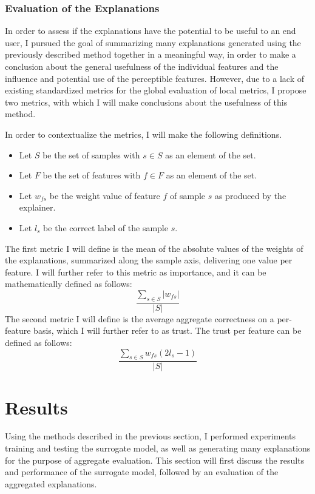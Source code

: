 \documentclass{article}
\begin{document}
			\subsubsection{Evaluation of the Explanations}
			In order to assess if the explanations have the potential to be useful to an end
			user, I pursued the goal of summarizing many explanations generated using the
			previously described method together in a meaningful way, in order to make a
			conclusion about the general usefulness of the individual features and the influence
			and potential use of the perceptible features. However, due to a lack of existing
			standardized metrics for the global evaluation of local metrics, I propose two
			metrics, with which I will make conclusions about the usefulness of this method.
			\par
			In order to contextualize the metrics, I will make the following definitions.
			\begin{itemize}
				\item Let \(S\) be the set of samples with \(s \in S\) as an element of the set.
				\item Let \(F\) be the set of features with \(f \in F\) as an element of the set.
				\item Let \(w_{fs}\) be the weight value of feature \(f\) of sample \(s\) as
					produced by the explainer.
				\item Let \(l_{s}\) be the correct label of the sample \(s\).
			\end{itemize}
			The first metric I will define is the mean of the absolute values of the weights of
			the explanations, summarized along the sample axis, delivering one value per feature.
			I will further refer to this metric as importance, and it can be mathematically
			defined as follows:
			\[\frac{\sum_{s \in S} |w_{fs}|}{|S|}\]
			The second metric I will define is the average aggregate correctness on a per-feature
			basis, which I will further refer to as trust. The trust per feature can be defined as
			follows:
			\[\frac{\sum_{s \in S} w_{fs}(2l_{s}-1)}{|S|}\]
	\section{Results}
	Using the methods described in the previous section, I performed experiments training and
	testing the surrogate model, as well as generating many explanations for the purpose of
	aggregate evaluation. This section will first discuss the results and performance of the
	surrogate model, followed by an evaluation of the aggregated explanations.
\end{document}
